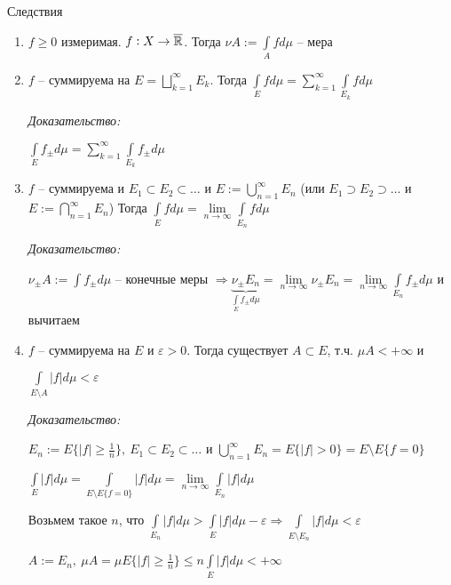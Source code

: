 \documentclass[12pt]{article}
\begin{document}
\begin{theo}{Следствия}
    \begin{enumerate}
        \item $f \geq 0$ измеримая. $f : X \to \overline{\mathbb R}$. Тогда $\nu A := \int\limits_A fd\mu$ -- мера
        \item $f$ -- суммируема на $E = \bigsqcup\limits_{k = 1}^\infty E_k$. Тогда $\int\limits_E fd\mu = \sum\limits_{k = 1}^\infty \int\limits_{E_k} fd\mu$
        
        \textit{Доказательство:}

        $\int\limits_E f_\pm d\mu = \sum\limits_{k = 1}^\infty \int\limits_{E_k} f_\pm d\mu$ 

        \item $f$ -- суммируема и $E_1 \subset E_2 \subset \ldots$ и $E := \bigcup\limits_{n = 1}^\infty E_n$ (или $E_1 \supset E_2 \supset \ldots$ и $E := \bigcap\limits_{n = 1}^\infty E_n$) Тогда $\int\limits_E fd\mu = \lim\limits_{n \to \infty} \int\limits_{E_n} fd\mu$
        
        \textit{Доказательство:}

        $\nu_\pm A := \int f_\pm d\mu$ -- конечные меры $\Rightarrow \underbrace{\nu_\pm E_n}_{\int\limits_E f_\pm d\mu} = \lim\limits_{n \to \infty} \nu_\pm E_n = \lim\limits_{n \to \infty} \int\limits_{E_n} f_\pm d\mu$ и вычитаем

        \item $f$ -- суммируема на $E$ и $\varepsilon > 0$. Тогда существует $A \subset E$, т.ч. $\mu A < + \infty$ и 
        
        $\int\limits_{E \setminus A} |f|d\mu < \varepsilon$
        
        \textit{Доказательство:}

        $E_n := E\{|f| \geq \frac{1}{n}\},\ E_1 \subset E_2 \subset \ldots$ и $\bigcup\limits_{n = 1}^\infty E_n = E\{|f| > 0\} = E \setminus E\{f = 0\}$

        $\int\limits_E |f|d\mu = \int\limits_{E \setminus E\{f = 0\}} |f|d\mu = \lim\limits_{n \to \infty} \int\limits_{E_n} |f|d\mu$

        Возьмем такое $n$, что $\int\limits_{E_n} |f|d\mu > \int\limits_E |f|d\mu - \varepsilon \Rightarrow \int\limits_{E \setminus E_n} |f|d\mu < \varepsilon$

        $A := E_n,\ \mu A = \mu E\{|f| \geq \frac{1}{n}\} \leq n \int\limits_E |f|d\mu < + \infty$
    \end{enumerate}
\end{theo}
\end{document}
